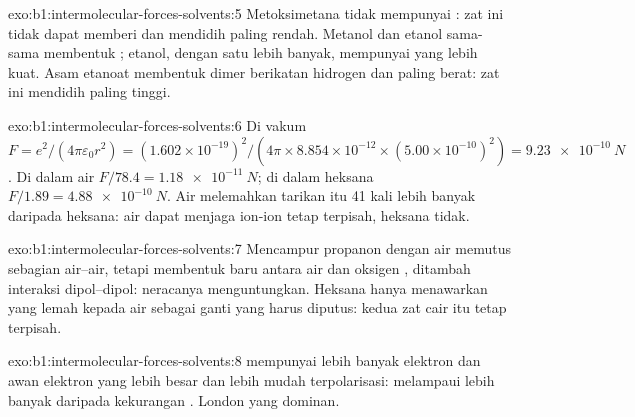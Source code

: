 \begin{solution}{exo:b1:intermolecular-forces-solvents:5}
Metoksimetana tidak mempunyai : zat ini tidak dapat memberi
 dan mendidih paling rendah. Metanol dan etanol sama-sama
membentuk ; etanol, dengan satu  lebih banyak,
mempunyai  yang lebih kuat. Asam etanoat membentuk dimer
berikatan hidrogen dan paling berat: zat ini mendidih paling tinggi.
\end{solution}

\begin{solution}{exo:b1:intermolecular-forces-solvents:6}
Di vakum $F = e^2/(4\pi\varepsilon_0 r^2) = (1.602 \times
10^{-19})^2/(4\pi \times 8.854 \times 10^{-12} \times (5.00 \times
10^{-10})^2) = \qty{9.23e-10}{N}$. Di dalam air $F/78.4 = \qty{1.18e-11}{N}$;
di dalam heksana $F/1.89 = \qty{4.88e-10}{N}$. Air melemahkan tarikan itu
41 kali lebih banyak daripada heksana: air dapat menjaga ion-ion tetap
terpisah, heksana tidak.
\end{solution}

\begin{solution}{exo:b1:intermolecular-forces-solvents:7}
Mencampur propanon dengan air memutus sebagian  air--air,
tetapi membentuk  baru antara air dan oksigen ,
ditambah interaksi dipol--dipol: neracanya menguntungkan. Heksana hanya
menawarkan  yang lemah kepada air sebagai ganti  yang harus diputus: kedua zat cair itu tetap terpisah.
\end{solution}

\begin{solution}{exo:b1:intermolecular-forces-solvents:8}
 mempunyai lebih banyak elektron dan awan elektron yang lebih
besar dan lebih mudah terpolarisasi:  melampaui
  lebih banyak daripada kekurangan . London yang dominan.
\end{solution}

